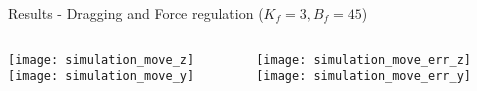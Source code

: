 \begin{frame}{Results - Dragging and Force regulation \hfill($K_f = 3, B_f = 45 $)}
  \vskip0.1in
  \begin{columns}
    \begin{column}{0.45\textwidth}
      \texttt{[image: simulation\_move\_z]}\\
      \vskip0.1in
      \texttt{[image: simulation\_move\_y]}
    \end{column}
    \begin{column}{0.45\textwidth}
      \texttt{[image: simulation\_move\_err\_z]}\\
      \vskip0.1in
      \texttt{[image: simulation\_move\_err\_y]}
    \end{column}
  \end{columns}
\end{frame}

